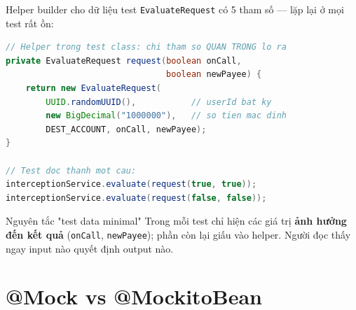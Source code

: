 \documentclass[aspectratio=169,12pt]{beamer}
\begin{document}
\begin{frame}[fragile]{Helper builder cho dữ liệu test}
  \texttt{EvaluateRequest} có 5 tham số --- lặp lại ở mọi test rất ồn:
\begin{lstlisting}[language=java,basicstyle=\ttfamily\scriptsize]
// Helper trong test class: chi tham so QUAN TRONG lo ra
private EvaluateRequest request(boolean onCall,
                                boolean newPayee) {
    return new EvaluateRequest(
        UUID.randomUUID(),           // userId bat ky
        new BigDecimal("1000000"),   // so tien mac dinh
        DEST_ACCOUNT, onCall, newPayee);
}

// Test doc thanh mot cau:
interceptionService.evaluate(request(true, true));
interceptionService.evaluate(request(false, false));
\end{lstlisting}

  \begin{block}{Nguyên tắc "test data minimal"}
    Trong mỗi test chỉ hiện các giá trị \textbf{ảnh hưởng đến kết quả}
    (\texttt{onCall}, \texttt{newPayee}); phần còn lại giấu vào helper.
    Người đọc thấy ngay input nào quyết định output nào.
  \end{block}
\end{frame}

\section{@Mock vs @MockitoBean}
\end{document}
